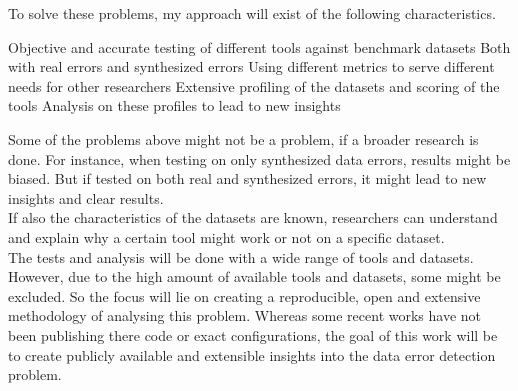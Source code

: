 To solve these problems, my approach will exist of the following characteristics.
\begin{outline}
    \1 Objective and accurate testing of different tools against benchmark datasets
        \2 Both with real errors and synthesized errors
        \2 Using different metrics to serve different needs for other researchers
    \1 Extensive profiling of the datasets and scoring of the tools
        \2 Analysis on these profiles to lead to new insights
\end{outline}
Some of the problems above might not be a problem, if a broader research is done. For instance, when testing on only synthesized data errors, results might be biased. But if tested on both real and synthesized errors, it might lead to new insights and clear results.\\
If also the characteristics of the datasets are known, researchers can understand and explain why a certain tool might work or not on a specific dataset.\\
The tests and analysis will be done with a wide range of tools and datasets. However, due to the high amount of available tools and datasets, some might be excluded. So the focus will lie on creating a reproducible, open and extensive methodology of analysing this problem. Whereas some recent works have not been publishing there code or exact configurations, the goal of this work will be to create publicly available and extensible insights into the data error detection problem.
